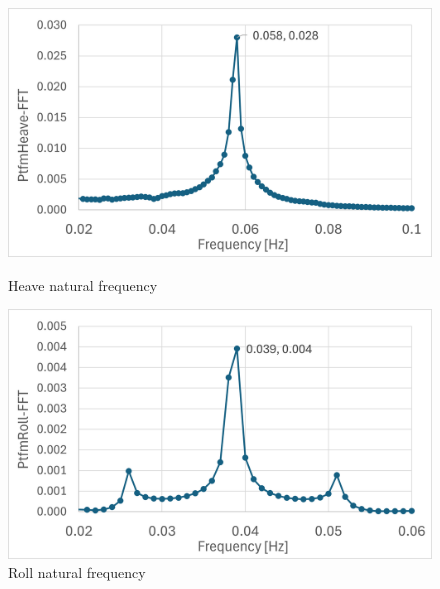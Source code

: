 \documentclass[a4paper, 11pt]{article}
\begin{document}
\begin{figure}[H]
    \begin{minipage}{0.49\textwidth}
        \centering
        \includegraphics[width=1\textwidth]{nat_freq_heave.png}
        \caption{\small Heave natural frequency}
        \label{fig:nat_freq_heave}
    \end{minipage}
    \hfill
    \begin{minipage}{0.5\textwidth}
        \centering
        \includegraphics[width=1\textwidth]{nat_freq_roll.png}
        \caption{\small Roll natural frequency}
        \label{fig:nat_freq_roll}
    \end{minipage}
\end{figure}
\end{document}
